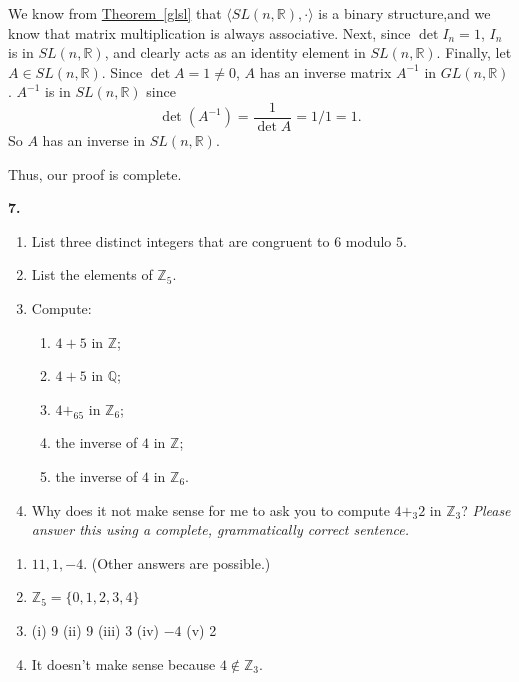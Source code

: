 \documentclass[10pt,]{book}
\theoremstyle{plain}
\theoremstyle{definition}
\theoremstyle{definition}
\theoremstyle{definition}
\theoremstyle{definition}
\numberwithin{equation}{section}
\def\Z{\mathbb{Z}}
\def\R{\mathbb{R}}
\def\Q{\mathbb{Q}}
\begin{document}
\par\smallskip
We know from \hyperref[glsl]{Theorem~\ref{glsl}} that \(\langle SL(n,\R),\cdot\rangle\) is a binary structure,and we know that matrix multiplication is always associative. Next, since \(\det I_n=1\), \(I_n\) is in \(SL(n,\R)\), and clearly acts as an identity element in \(SL(n,\R)\). Finally, let \(A\in SL(n,\R)\).  Since \(\det A=1\neq 0\), \(A\) has an inverse matrix \(A^{-1}\) in \(GL(n, \R)\).  \(A^{-1}\) is in \(SL(n,\R)\) since%
\begin{equation*}
\det(A^{-1})=\frac{1}{\det A}=1/1=1.
\end{equation*}
So \(A\) has an inverse in \(SL(n,\R)\).%
\par
Thus, our proof is complete.%
\par\smallskip
\noindent\textbf{7.}\quad{}\leavevmode%
\begin{enumerate}[label=(\alph*)]
\item\hypertarget{li-113}{}List three distinct integers that are congruent to \(6\) modulo \(5\).%
\item\hypertarget{li-114}{}List the elements of \(\Z_5\).%
\item\hypertarget{li-115}{}Compute: %
\begin{enumerate}[label=\roman*.]
\item\hypertarget{li-116}{}\(4+5\) in \(\Z\);%
\item\hypertarget{li-117}{}\(4+5\) in \(\Q\);%
\item\hypertarget{li-118}{}\(4+_65\) in \(\Z_6\);%
\item\hypertarget{li-119}{}the inverse of \(4\) in \(\Z\);%
\item\hypertarget{li-120}{}the inverse of \(4\) in \(\Z_6\).%
\end{enumerate}
%
\item\hypertarget{li-121}{}Why does it not make sense for me to ask you to compute \(4+_3 2\) in \(\Z_3\)? \emph{Please answer this using a complete, grammatically correct sentence.}%
\end{enumerate}
\par\smallskip
\leavevmode%
\begin{enumerate}[label=(\alph*)]
\item\hypertarget{li-122}{}\(11, 1, -4\). (Other answers are possible.)%
\item\hypertarget{li-123}{}\(\Z_5=\{0,1,2,3,4\}\)%
\item\hypertarget{li-124}{}(i) 9   (ii) 9   (iii) 3   (iv) \(-4\)   (v) 2%
\item\hypertarget{li-125}{}It doesn't make sense because \(4\not\in \Z_3\).%
\end{enumerate}
\end{document}
